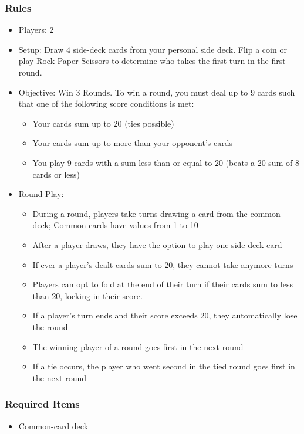 \documentclass[12pt, landscape]{article}
\begin{document}
\begin{FlushLeft}
\begin{multicols}{2}
			\subsubsection{Rules}
			\begin{itemize}
				\item Players: 2
				\item Setup: Draw 4 side-deck cards from your personal side deck. Flip a coin or play Rock Paper Scissors to determine who takes the first turn in the first round.
				\item Objective: Win 3 Rounds. To win a round, you must deal up to 9 cards such that one of the following score conditions is met:
				\begin{itemize}
					\item Your cards sum up to 20 (ties possible)
					\item Your cards sum up to more than your opponent's cards
					\item You play 9 cards with a sum less than or equal to 20 (beats a 20-sum of 8 cards or less)
				\end{itemize}
				\item Round Play:
				\begin{itemize}
					\item During a round, players take turns drawing a card from the common deck; Common cards have values from 1 to 10
					\item After a player draws, they have the option to play one side-deck card
					\item If ever a player's dealt cards sum to 20, they cannot take anymore turns
					\item Players can opt to fold at the end of their turn if their cards sum to less than 20, locking in their score.
					\item If a player's turn ends and their score exceeds 20, they automatically lose the round
					\item The winning player of a round goes first in the next round
					\item If a tie occurs, the player who went second in the tied round goes first in the next round
				\end{itemize}
			\end{itemize}
			\columnbreak

			\subsubsection{Required Items}
			\begin{itemize}
				\item Common-card deck


\end{itemize}
\end{multicols}
\end{FlushLeft}
\end{document}

